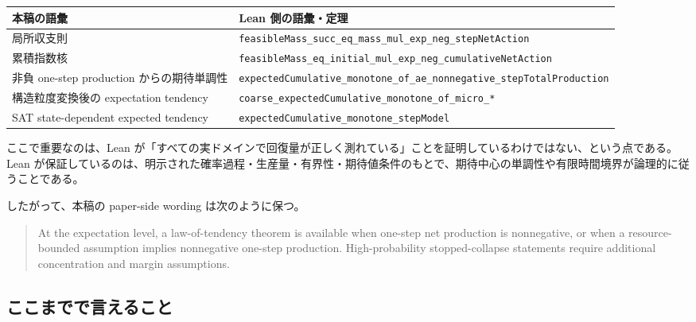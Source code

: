 \documentclass[12pt,a4paper]{article}
\begin{document}
{\def\LTcaptype{table} %
\begin{longtable}[]{@{}
  >{\raggedright\arraybackslash}p{}
  >{\raggedright\arraybackslash}p{}@{}}
\toprule\noalign{}
\begin{minipage}[b]{\linewidth}\raggedright
本稿の語彙
\end{minipage} & \begin{minipage}[b]{\linewidth}\raggedright
Lean 側の語彙・定理
\end{minipage} \\
\midrule\noalign{}
\endhead
\bottomrule\noalign{}
\endlastfoot
局所収支則 & \texttt{feasibleMass\_succ\_eq\_mass\_mul\_exp\_neg\_stepNetAction} \\
累積指数核 & \texttt{feasibleMass\_eq\_initial\_mul\_exp\_neg\_cumulativeNetAction} \\
非負 one-step production からの期待単調性 & \texttt{expectedCumulative\_monotone\_of\_ae\_nonnegative\_stepTotalProduction} \\
構造粒度変換後の expectation tendency & \texttt{coarse\_expectedCumulative\_monotone\_of\_micro\_*} \\
SAT state-dependent expected tendency & \texttt{expectedCumulative\_monotone\_stepModel} \\
\end{longtable}
}

ここで重要なのは、Lean が「すべての実ドメインで回復量が正しく測れている」ことを証明しているわけではない、という点である。Lean が保証しているのは、明示された確率過程・生産量・有界性・期待値条件のもとで、期待中心の単調性や有限時間境界が論理的に従うことである。

したがって、本稿の paper-side wording は次のように保つ。

\begin{quote}
At the expectation level, a law-of-tendency theorem is available when one-step net production is nonnegative, or when a resource-bounded assumption implies nonnegative one-step production. High-probability stopped-collapse statements require additional concentration and margin assumptions.
\end{quote}

\subsection{ここまでで言えること}\label{ux3053ux3053ux307eux3067ux3067ux8a00ux3048ux308bux3053ux3068}
\end{document}
